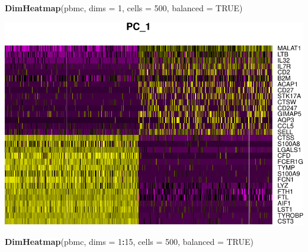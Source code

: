 \documentclass[
]{book}
\newenvironment{Shaded}{\begin{snugshade}}{\end{snugshade}}
\newcommand{\AttributeTok}[1]{\textcolor[rgb]{0.13,0.29,0.53}{#1}}
\newcommand{\ConstantTok}[1]{\textcolor[rgb]{0.56,0.35,0.01}{#1}}
\newcommand{\DecValTok}[1]{\textcolor[rgb]{0.00,0.00,0.81}{#1}}
\newcommand{\FunctionTok}[1]{\textcolor[rgb]{0.13,0.29,0.53}{\textbf{#1}}}
\newcommand{\NormalTok}[1]{#1}
\newcommand{\SpecialCharTok}[1]{\textcolor[rgb]{0.81,0.36,0.00}{\textbf{#1}}}
\begin{document}
\begin{Shaded}
\begin{Highlighting}[]
\FunctionTok{DimHeatmap}\NormalTok{(pbmc, }\AttributeTok{dims =} \DecValTok{1}\NormalTok{, }\AttributeTok{cells =} \DecValTok{500}\NormalTok{, }\AttributeTok{balanced =} \ConstantTok{TRUE}\NormalTok{)}
\end{Highlighting}
\end{Shaded}

\includegraphics{scRNAseqInR_Doco_files/figure-latex/single-heatmap-1.pdf}

\begin{Shaded}
\begin{Highlighting}[]
\FunctionTok{DimHeatmap}\NormalTok{(pbmc, }\AttributeTok{dims =} \DecValTok{1}\SpecialCharTok{:}\DecValTok{15}\NormalTok{, }\AttributeTok{cells =} \DecValTok{500}\NormalTok{, }\AttributeTok{balanced =} \ConstantTok{TRUE}\NormalTok{)}
\end{Highlighting}
\end{Shaded}
\end{document}
